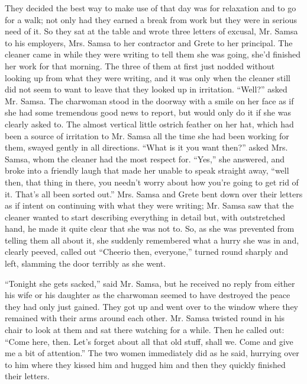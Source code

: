 \documentclass[12pt]{report}
\begin{document}
They decided the best way to make use of that day was for relaxation and
to go for a walk; not only had they earned a break from work but they
were in serious need of it. So they sat at the table and wrote three
letters of excusal, Mr. Samsa to his employers, Mrs. Samsa to her
contractor and Grete to her principal. The cleaner came in while they
were writing to tell them she was going, she'd finished her work for
that morning. The three of them at first just nodded without looking up
from what they were writing, and it was only when the cleaner still did
not seem to want to leave that they looked up in irritation. ``Well?''
asked Mr. Samsa. The charwoman stood in the doorway with a smile on her
face as if she had some tremendous good news to report, but would only
do it if she was clearly asked to. The almost vertical little ostrich
feather on her hat, which had been a source of irritation to Mr. Samsa
all the time she had been working for them, swayed gently in all
directions. ``What is it you want then?'' asked Mrs. Samsa, whom the
cleaner had the most respect for. ``Yes,'' she answered, and broke into
a friendly laugh that made her unable to speak straight away, ``well
then, that thing in there, you needn't worry about how you're going to
get rid of it. That's all been sorted out.'' Mrs. Samsa and Grete bent
down over their letters as if intent on continuing with what they were
writing; Mr. Samsa saw that the cleaner wanted to start describing
everything in detail but, with outstretched hand, he made it quite clear
that she was not to. So, as she was prevented from telling them all
about it, she suddenly remembered what a hurry she was in and, clearly
peeved, called out ``Cheerio then, everyone,'' turned round sharply and
left, slamming the door terribly as she went.

``Tonight she gets sacked,'' said Mr. Samsa, but he received no reply
from either his wife or his daughter as the charwoman seemed to have
destroyed the peace they had only just gained. They got up and went over
to the window where they remained with their arms around each other. Mr.
Samsa twisted round in his chair to look at them and sat there watching
for a while. Then he called out: ``Come here, then. Let's forget about
all that old stuff, shall we. Come and give me a bit of attention.'' The
two women immediately did as he said, hurrying over to him where they
kissed him and hugged him and then they quickly finished their letters.
\end{document}
